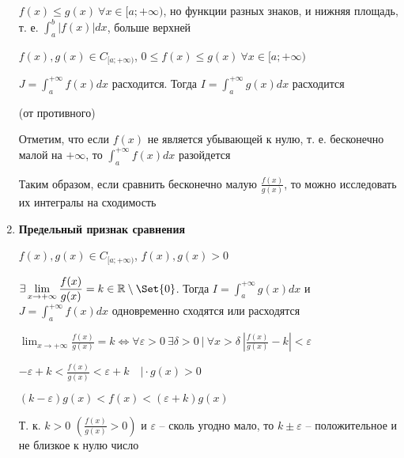 \documentclass[12pt]{article}
\begin{document}
\begin{enumerate}[label*=\textbf{\arabic** }]
        $f(x) \leq g(x) \ \forall x \in [a;+\infty)$, но функции разных знаков, и нижняя площадь, т. е. $\displaystyle \int^{b}_{a} |f(x)| dx$, больше верхней

        \begin{MyTheorem}
            $f(x), g(x) \in C_{[a;+\infty)}$, $0 \leq f(x) \leq g(x) \ \forall x \in [a;+\infty)$

            $\displaystyle J = \int^{+\infty}_{a} f(x) dx \text{  расходится. Тогда  } I = \int^{+\infty}_{a} g(x) dx \text{  расходится}$
        \end{MyTheorem}

        \begin{MyProof}
            \Lab (от противного)
        \end{MyProof}

        \Notas Отметим, что если $f(x)$ не является убывающей к нулю, т. е. бесконечно малой на $+\infty$, то $\displaystyle \int^{+\infty}_{a} f(x) dx$ разойдется

        Таким образом, если сравнить бесконечно малую $\displaystyle \frac{f(x)}{g(x)}$, то можно исследовать их интегралы на сходимость

        \hypertarget{improperintegralconvergenceinlimits}{}
        \item \textbf{Предельный признак сравнения}

        \begin{MyTheorem}
            $f(x), g(x) \in C_{[a;+\infty)}$, $f(x), g(x) > 0$

            $\displaystyle \exists \lim_{x\to+\infty} \frac{f(x)}{g(x)} = k \in \Real \setminus \Set{0}$.
            Тогда $\displaystyle I = \int^{+\infty}_{a} g(x)dx$ и $\displaystyle J = \int^{+\infty}_{a} f(x)dx$ одновременно сходятся или расходятся
        \end{MyTheorem}

        \begin{MyProof}
            $\displaystyle \lim_{x\to+\infty} \frac{f(x)}{g(x)} = k \Longleftrightarrow \forall \varepsilon > 0 \ \exists \delta > 0 \ | \ \forall x > \delta \ \left|\frac{f(x)}{g(x)} - k\right| < \varepsilon $

            $\displaystyle -\varepsilon + k < \frac{f(x)}{g(x)} < \varepsilon + k \quad \Big| \cdot g(x) > 0$

            $\displaystyle (k - \varepsilon)g(x) < f(x) < (\varepsilon + k)g(x)$

            Т. к. $k > 0$ $\left(\frac{f(x)}{g(x)} > 0\right)$ и $\varepsilon$ -- сколь угодно мало, то $k \pm \varepsilon$ -- положительное и не близкое к нулю число


\end{MyProof}
\end{enumerate}
\end{document}
